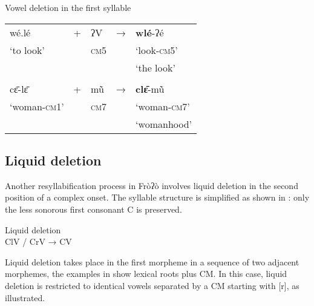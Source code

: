 \documentclass[output=paper]{langscibook}
\begin{document}
    \begin{exe}
        \ex Vowel deletion in the first syllable\label{ex:traore:vowelDeletionFirstSyllable:25}\\
        \begin{tabularx}{.5\textwidth}{l l l l l}
        wé.lé           &        +    & ʔV                  &       →       &        \textbf{wlé}{}-ʔé \\
        `to look'       &    {}       &   \textsc{cm}5      &      {}       &       `look-\textsc{cm}5'\\
                        &           &                       &               &       `the look'          \\
                                &           &                       &               &     \\
        cɛ̄-lɛ̄          &     +      & mũ̀              &       →       &    \textbf{clɛ̄}-mũ̀  \\
        `woman-\textsc{cm}1'    &   &   \textsc{cm}7        &               &   `woman-\textsc{cm}7'\\
                                &           &                       &               &  `womanhood'   \\
        \end{tabularx}
    \end{exe}

\subsection{ Liquid deletion}
\label{sec:traore:liquid_deletion:3c}

Another resyllabification process in Fròʔò involves liquid deletion in the second position of a complex onset. The syllable structure is simplified as shown in : only the less sonorous first consonant C is preserved.

\begin{exe}
    \ex Liquid deletion \label{ex:traore:liquidDeletion:26}\\
    ClV / CrV → CV
\end{exe}

Liquid deletion takes place in the first morpheme in a sequence of two adjacent morphemes, the examples in  show lexical roots plus CM. In this case, liquid deletion is restricted to identical vowels separated by a CM starting with [r], as illustrated.
    
\end{document}
